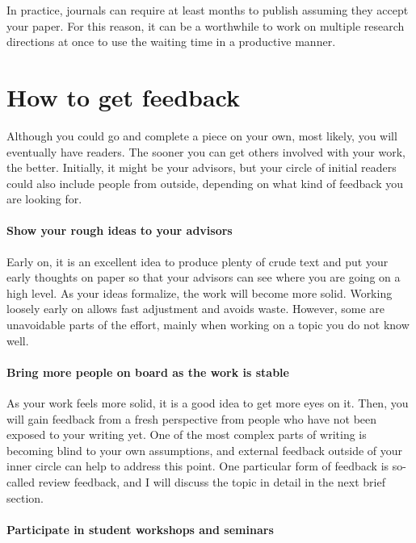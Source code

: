 In practice, journals can require at least months to publish assuming they accept your paper.
For this reason, it can be a worthwhile to work on multiple research directions at once to use the waiting time in a productive manner.

\section{How to get feedback}

Although you could go and complete a piece on your own, most likely, you will eventually have readers.
The sooner you can get others involved with your work, the better.
Initially, it might be your advisors, but your circle of initial readers could also include people from outside, depending on what kind of feedback you are looking for.

\paragraph{Show your rough ideas to your advisors}

Early on, it is an excellent idea to produce plenty of crude text and put your early thoughts on paper so that your advisors can see where you are going on a high level.
As your ideas formalize, the work will become more solid.
Working loosely early on allows fast adjustment and avoids waste. However, some are unavoidable parts of the effort, mainly when working on a topic you do not know well.

\paragraph{Bring more people on board as the work is stable}

As your work feels more solid, it is a good idea to get more eyes on it.
Then, you will gain feedback from a fresh perspective from people who have not been exposed to your writing yet.
One of the most complex parts of writing is becoming blind to your own assumptions, and external feedback outside of your inner circle can help to address this point.
One particular form of feedback is so-called review feedback, and I will discuss the topic in detail in the next brief section.

\paragraph{Participate in student workshops and seminars}

